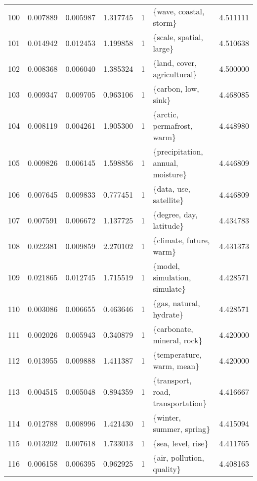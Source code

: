 \begin{tabular}{lrrrrlr}
100 &    0.007889 &  0.005987 &        1.317745 &           1 &                  \{wave, coastal, storm\} &  4.511111 \\
101 &    0.014942 &  0.012453 &        1.199858 &           1 &                 \{scale, spatial, large\} &  4.510638 \\
102 &    0.008368 &  0.006040 &        1.385324 &           1 &             \{land, cover, agricultural\} &  4.500000 \\
103 &    0.009347 &  0.009705 &        0.963106 &           1 &                     \{carbon, low, sink\} &  4.468085 \\
104 &    0.008119 &  0.004261 &        1.905300 &           1 &              \{arctic, permafrost, warm\} &  4.448980 \\
105 &    0.009826 &  0.006145 &        1.598856 &           1 &       \{precipitation, annual, moisture\} &  4.446809 \\
106 &    0.007645 &  0.009833 &        0.777451 &           1 &                  \{data, use, satellite\} &  4.446809 \\
107 &    0.007591 &  0.006672 &        1.137725 &           1 &                 \{degree, day, latitude\} &  4.434783 \\
108 &    0.022381 &  0.009859 &        2.270102 &           1 &                 \{climate, future, warm\} &  4.431373 \\
109 &    0.021865 &  0.012745 &        1.715519 &           1 &           \{model, simulation, simulate\} &  4.428571 \\
110 &    0.003086 &  0.006655 &        0.463646 &           1 &                 \{gas, natural, hydrate\} &  4.428571 \\
111 &    0.002026 &  0.005943 &        0.340879 &           1 &              \{carbonate, mineral, rock\} &  4.420000 \\
112 &    0.013955 &  0.009888 &        1.411387 &           1 &               \{temperature, warm, mean\} &  4.420000 \\
113 &    0.004515 &  0.005048 &        0.894359 &           1 &       \{transport, road, transportation\} &  4.416667 \\
114 &    0.012788 &  0.008996 &        1.421430 &           1 &                \{winter, summer, spring\} &  4.415094 \\
115 &    0.013202 &  0.007618 &        1.733013 &           1 &                      \{sea, level, rise\} &  4.411765 \\
116 &    0.006158 &  0.006395 &        0.962925 &           1 &               \{air, pollution, quality\} &  4.408163 \\

\end{tabular}
